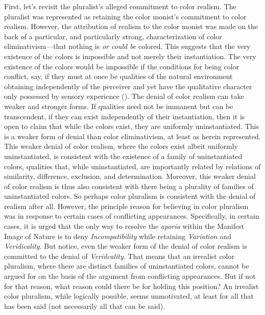 \documentclass[12pt]{article}
\begin{document}
First, let's revisit the pluralist's alleged commitment to color realism. The pluralist was represented as retaining the color monist's commitment to color realism. However, the attribution of realism to the color monist was made on the back of a particular, and particularly strong, characterization of color eliminativism---that nothing is \emph{or could be} colored. This suggests that the very existence of the colors is impossible and not merely their instantiation. The very existence of the colors would be impossible if the conditions for being color conflict, say, if they must at once be qualities of the natural environment obtaining independently of the perceiver and yet have the qualitative character only possessed by sensory experience (\citealt{Boghossian-Velleman:1989af,Boghossian-Velleman:1991as}). The denial of color realism can take weaker and stronger forms. If qualities need not be immanent but can be transcendent, if they can exist independently of their instantiation, then it is open to claim that while the colors exist, they are uniformly uninstantiated. This is a weaker form of denial than color eliminativism, at least as herein represented. This weaker denial of color realism, where the colors exist albeit uniformly uninstantiated, is consistent with the existence of a family of uninstantiated colors, qualities that, while uninstantiated, are importantly related by relations of similarity, difference, exclusion, and determination. Moreover, this weaker denial of color realism is thus also consistent with there being a plurality of families of uninstantiated colors. So perhaps color pluralism is consistent with the denial of realism after all. However, the principle reason for believing in color pluralism was in response to certain cases of conflicting appearances. Specifically, in certain cases, it is urged that the only way to resolve the \emph{aporia} within the Manifest Image of Nature is to deny \emph{Incompatibility} while retaining \emph{Variation} and \emph{Veridicality}. But notice, even the weaker form of the denial of color realism is committed to the denial of \emph{Veridcality}. That means that an irrealist color pluralism, where there are distinct families of uninstantiated colors, cannot be argued for on the basis of the argument from conflicting appearances. But if not for that reason, what reason could there be for holding this position? An irrealist color pluralism, while logically possible, seems unmotivated, at least for all that has been said (not necessarily all that can be said).
\end{document}
